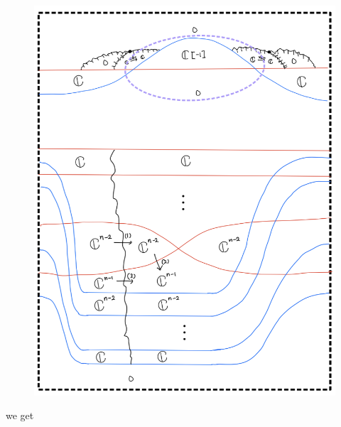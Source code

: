 \begin{enumerate}[label = (\roman*)]
\begin{enumerate}[label = (Case \arabic*)]
\begin{enumerate}[label = (Step \arabic*)]
\begin{figure}[H]
    \centering
    \includegraphics[scale = 0.95]{diagrams/cobord_gen/11.png}
    \caption{}
    \label{fig:your-label}
\end{figure}
\pagebreak
we get


\end{enumerate}
\end{enumerate}
\end{enumerate}
